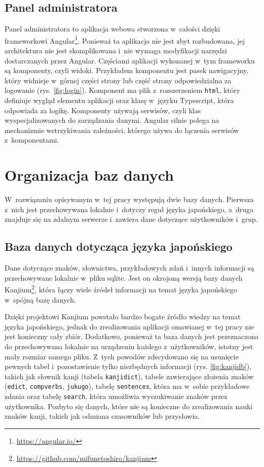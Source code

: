 \documentclass[a4paper,twoside,12pt]{book}
\begin{document}
\subsection{Panel administratora}
\label{sec:2}

Panel administratora to aplikacja webowa stworzona w~całości dzięki frameworkowi Angular\footnote{\url{https://angular.io/}}. Ponieważ ta aplikacja nie jest zbyt rozbudowana, jej architektura nie jest skomplikowana i~nie wymaga modyfikacji narzędzi dostarczanych przez Angular. Częściami aplikacji wykonanej w~tym frameworku są komponenty, czyli widoki. Przykładem komponentu jest pasek nawigacyjny, który widnieje w~górnej części strony lub część strony odpowiedzialna za logowanie (rys. \ref{fig:login}). Komponent ma plik z~rozszerzeniem \texttt{html}, który definiuje wygląd elementu aplikacji oraz klasę w~języku Typescript, która odpowiada za logikę. Komponenty używają serwisów, czyli klas wyspecjalizowanych do zarządzania danymi. Angular silnie polega na mechanizmie wstrzykiwania zależności, którego używa do łączenia serwisów z~komponentami. 

\section{Organizacja baz danych}

W~rozwiązaniu opisywanym w~tej pracy występują dwie bazy danych. Pierwsza z~nich jest przechowywana lokalnie i~dotyczy reguł języka japońskiego, a~druga znajduje się na zdalnym serwerze i~zawiera dane dotyczące użytkowników i~grup.

\subsection{Baza danych dotycząca języka japońskiego}
\label{sec:3}

Dane dotyczące znaków, słownictwa, przykładowych zdań i~innych informacji są przechowywane lokalnie w~pliku sqlite. Jest on okrojoną wersją bazy danych Kanjium\footnote{\url{https://github.com/mifunetoshiro/kanjium}}, która łączy wiele źródeł informacji na temat języka japońskiego w~spójną bazę danych. 

Dzięki projektowi Kanjium powstało bardzo bogate źródło wiedzy na temat języka japońskiego, jednak do zrealizowania aplikacji omawianej w~tej pracy nie jest konieczny cały zbiór. Dodatkowo, ponieważ ta baza danych jest przeznaczona do przechowywana lokalnie na urządzeniu każdego z~użytkowników, istotny jest mały rozmiar samego pliku. Z~tych powodów zdecydowano się na usunięcie pewnych tabel i~pozostawienie tylko niezbędnych informacji (rys. \ref{fig:kanjidb}), takich jak słownik kanji (tabela \texttt{kanjidict}), tabele zawierające złożenia znaków (\texttt{edict}, \texttt{compverbs}, \texttt{jukugo}), tabelę \texttt{sentences}, która ma w~sobie przykładowe zdania oraz tabelę \texttt{search}, która umożliwia wyszukiwanie znaków przez użytkownika. Pozbyto się danych, które nie są konieczne do zrealizowania nauki znaków kanji, takich jak odmiana czasowników lub przysłowia.
\end{document}
